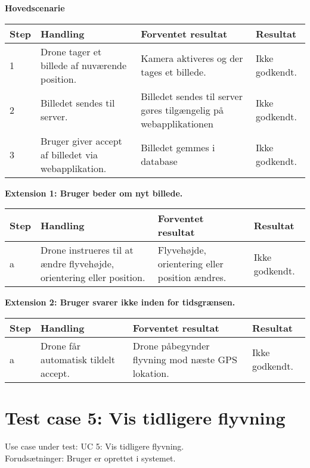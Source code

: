 \textbf{Hovedscenarie}
\begin{table}[H]
	\centering
		\begin{tabular}{|l|p{5 cm}|p{5 cm}|p{2.5 cm}|} 
		\hline
			\textbf{Step} & \textbf{Handling} & \textbf{Forventet resultat} & \textbf{Resultat} \\ \hline
			1 & Drone tager et billede af \newline nuværende position. & Kamera aktiveres og der \newline tages et billede. & Ikke godkendt. \\ \hline
			2 & Billedet sendes til server. & Billedet sendes til server gøres tilgængelig på \newline webapplikationen & Ikke godkendt. \\ \hline
			3 & Bruger giver accept af billedet via webapplikation. & Billedet gemmes i database  & Ikke godkendt. \\ \hline

		\end{tabular}
\end{table}


\textbf{Extension 1: Bruger beder om nyt billede.}
\begin{table}[H]
	\centering
		\begin{tabular}{|l|p{5 cm}|p{5 cm}|p{2.5 cm}|} 
		\hline
			\textbf{Step} & \textbf{Handling} & \textbf{Forventet resultat} & \textbf{Resultat} \\ \hline
			a & Drone instrueres til at \newline ændre flyvehøjde, orientering eller position. &  Flyvehøjde, orientering eller position ændres. & Ikke godkendt. \\ \hline
		\end{tabular}
\end{table}

\textbf{Extension 2: Bruger svarer ikke inden for tidsgrænsen.}
\begin{table}[H]
	\centering
		\begin{tabular}{|l|p{5 cm}|p{5 cm}|p{2.5 cm}|} 
		\hline
			\textbf{Step} & \textbf{Handling} & \textbf{Forventet resultat} & \textbf{Resultat} \\ \hline
			a & Drone får automatisk tildelt accept. & Drone påbegynder flyvning mod næste GPS lokation. & Ikke godkendt. \\ \hline
		\end{tabular}
\end{table}

\newpage
\section{Test case 5: Vis tidligere flyvning}
Use case under test: UC 5: Vis tidligere flyvning.\\
Forudsætninger:	Bruger er oprettet i systemet.

